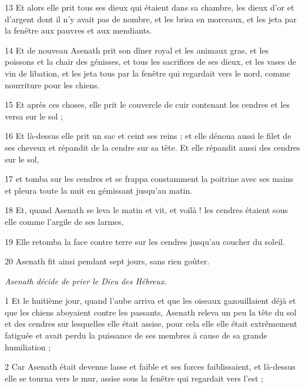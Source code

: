 \par 13 Et alors elle prit tous ses dieux qui étaient dans sa chambre, les dieux d'or et d'argent dont il n'y avait pas de nombre, et les brisa en morceaux, et les jeta par la fenêtre aux pauvres et aux mendiants.

\par 14 Et de nouveau Asenath prit son dîner royal et les animaux gras, et les poissons et la chair des génisses, et tous les sacrifices de ses dieux, et les vases de vin de libation, et les jeta tous par la fenêtre qui regardait vers le nord, comme nourriture pour les chiens.

\par 15 Et après ces choses, elle prit le couvercle de cuir contenant les cendres et les versa sur le sol ;

\par 16 Et là-dessus elle prit un sac et ceint ses reins ; et elle dénoua aussi le filet de ses cheveux et répandit de la cendre sur sa tête. Et elle répandit aussi des cendres sur le sol,

\par 17 et tomba sur les cendres et se frappa constamment la poitrine avec ses mains et pleura toute la nuit en gémissant jusqu'au matin.

\par 18 Et, quand Asenath se leva le matin et vit, et voilà ! les cendres étaient sous elle comme l'argile de ses larmes,

\par 19 Elle retomba la face contre terre sur les cendres jusqu'au coucher du soleil.

\par 20 Asenath fit ainsi pendant sept jours, sans rien goûter.


\par \textit{Asenath décide de prier le Dieu des Hébreux.}

\par 1 Et le huitième jour, quand l'aube arriva et que les oiseaux gazouillaient déjà et que les chiens aboyaient contre les passants, Asenath releva un peu la tête du sol et des cendres sur lesquelles elle était assise, pour cela elle elle était extrêmement fatiguée et avait perdu la puissance de ses membres à cause de sa grande humiliation ;

\par 2 Car Asenath était devenue lasse et faible et ses forces faiblissaient, et là-dessus elle se tourna vers le mur, assise sous la fenêtre qui regardait vers l'est ;


